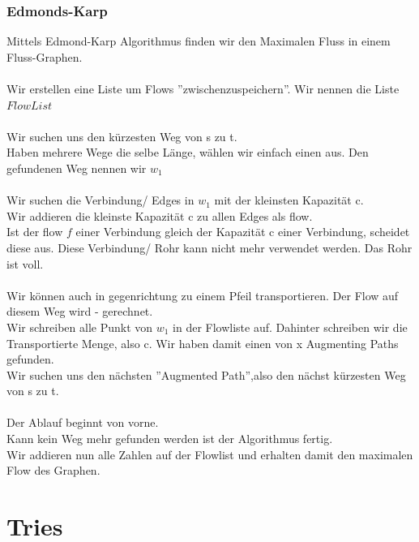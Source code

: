 \documentclass[a4paper,10pt]{report}
\begin{document}
\subsubsection{Edmonds-Karp}
Mittels Edmond-Karp Algorithmus finden wir den Maximalen Fluss in einem Fluss-Graphen.\\
\\
Wir erstellen eine Liste um Flows ''zwischenzuspeichern''. Wir nennen die Liste $FlowList$\\
\\
Wir suchen uns den kürzesten Weg von s zu t.\\
Haben mehrere Wege die selbe Länge, wählen wir einfach einen aus.
Den gefundenen Weg nennen wir $w_1$\\
\\
Wir suchen die Verbindung/ Edges in $w_1$ mit der kleinsten Kapazität c.\\
Wir addieren die kleinste Kapazität c zu allen Edges als flow.\\
Ist der flow $f$ einer Verbindung gleich der Kapazität c einer Verbindung, scheidet diese aus. Diese Verbindung/ Rohr kann nicht mehr verwendet werden. Das Rohr ist voll.\\
\\
Wir können auch in gegenrichtung zu einem Pfeil transportieren. Der Flow auf diesem Weg wird - gerechnet.
\\
Wir schreiben alle Punkt von $w_1$ in der Flowliste auf. Dahinter schreiben wir die Transportierte Menge, also c. Wir haben damit einen von x  Augmenting Paths gefunden.
\\
Wir suchen uns den nächsten ''Augmented Path'',also den nächst kürzesten Weg von s zu t.\\
\\
Der Ablauf beginnt von vorne. \\
Kann kein Weg mehr gefunden werden ist der Algorithmus fertig.\\
Wir addieren nun alle Zahlen auf der Flowlist und erhalten damit den maximalen Flow des Graphen.
\newpage
\section{Tries}
\end{document}
